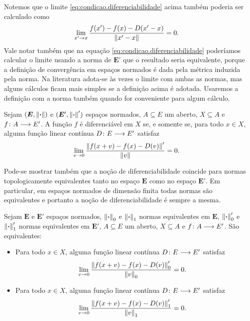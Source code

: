 Notemos que o limite \ref{eq:condicao.diferenciabilidade} acima também poderia ser calculado como
	\begin{equation*}
	\lim_{x' \to x} \frac{f(x') - f(x) - D(x'-x)}{\left\Vert{x'-x}\right\Vert} = 0.
	\end{equation*}
Vale notar também que na equação \ref{eq:condicao.diferenciabilidade} poderíamos calcular o limite usando a norma de $\bm E'$ que o resultado seria equivalente, porque a definição de convergência em espaços normados é dada pela métrica induzida pela norma. Na literatura adota-se às vezes o limite com ambas as normas, mas alguns cálculos ficam mais simples se a definição acima é adotada. Usaremos a definição com a norma também quando for conveniente para algum cálculo.

\begin{exercise}
Sejam $(\bm E,\left\Vert{\bm{\cdot}}\right\Vert)$ e $(\bm E',\left\Vert{\bm{\cdot}}\right\Vert')$ espaços normados, $A \subseteq E$ um aberto, $X \subseteq A$ e ${f}\colon {A} \longrightarrow {E'}$. A função $f$ é diferenciável em $X$ se, e somente se, para todo $x \in X$, alguma função linear contínua ${D}\colon {E} \longrightarrow {E'}$ satisfaz
	\begin{equation*}
	\lim_{v \to 0} \frac{\left\Vert{f(x+v) - f(x) - D(v)}\right\Vert'}{\left\Vert{v}\right\Vert} = 0.
	\end{equation*}
\end{exercise}

Pode-se mostrar também que a noção de diferenciabilidade coincide para normas topologicamente equivalentes tanto no espaço $\bm E$ como no espaço $\bm E'$. Em particular, em espaços normados de dimensão finita todas normas são equivalentes e portanto a noção de diferenciabilidade é sempre a mesma.

\begin{exercise}
Sejam $\bm E$ e $\bm E'$ espaços normados, $\left\Vert{\bm{\cdot}}\right\Vert_0$ e $\left\Vert{\bm{\cdot}}\right\Vert_1$ normas equivalentes em $\bm E$, $\left\Vert{\bm{\cdot}}\right\Vert'_0$ e $\left\Vert{\bm{\cdot}}\right\Vert'_1$ normas equivalentes em $\bm E'$, $A \subseteq E$ um aberto, $X \subseteq A$ e ${f}\colon {A} \longrightarrow {E'}$. São equivalentes:
	\begin{itemize}
	\item Para todo $x \in X$, alguma função linear contínua ${D}\colon {E} \longrightarrow {E'}$ satisfaz
		\begin{equation*}
		\lim_{v \to 0} \frac{\left\Vert{f(x+v) - f(x) - D(v)}\right\Vert'_0}{\left\Vert{v}\right\Vert_0} = 0.
		\end{equation*}
	\item Para todo $x \in X$, alguma função linear contínua ${D}\colon {E} \longrightarrow {E'}$ satisfaz
		\begin{equation*}
		\lim_{v \to 0} \frac{\left\Vert{f(x+v) - f(x) - D(v)}\right\Vert'_1}{\left\Vert{v}\right\Vert_1} = 0.
		\end{equation*}
	\end{itemize}
\end{exercise}

